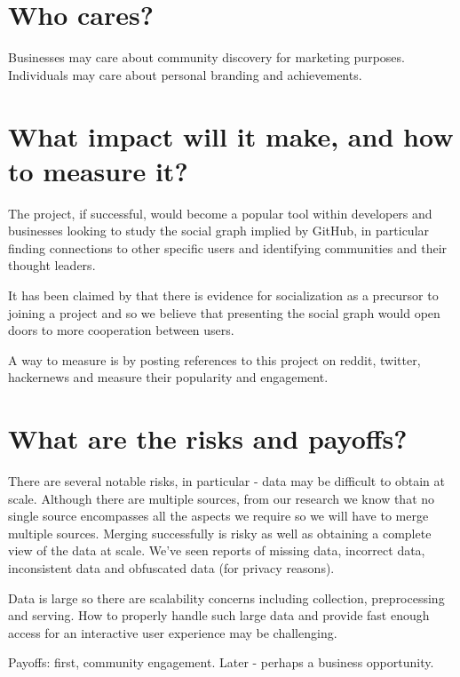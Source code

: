 \documentclass[sigconf,11pt]{acmart}
\begin{document}
\section*{Who cares?}
Businesses may care about community discovery for marketing purposes.
Individuals may care about personal branding and achievements.

\section*{What impact will it make, and how to measure it?}
The project, if successful, would become a popular tool within developers and businesses
looking to study the social graph implied by GitHub, in particular finding connections to other specific users
and identifying communities and their thought leaders.

It has been claimed by \citeauthor{developer-onboarding-github}\cite{developer-onboarding-github}
that there is evidence for socialization as a precursor to joining a project
and so we believe that presenting the social graph would open doors to more cooperation between users.

A way to measure is by posting references to this project on reddit, twitter, hackernews and measure their
popularity and engagement.

\section*{What are the risks and payoffs?}
There are several notable risks, in particular - data may be difficult to obtain at scale.
Although there are multiple sources, from our research we know that no single source encompasses all the aspects
we require so we will have to merge multiple sources.
Merging successfully is risky as well as obtaining a complete view of the data at scale.
We've seen reports of missing data, incorrect data, inconsistent data and obfuscated data (for privacy reasons)\cite{promises-and-perils-mining-github}.

Data is large so there are scalability concerns including collection, preprocessing and serving.
How to properly handle such large data and provide fast enough access for an interactive user experience may be challenging.

Payoffs: first, community engagement. Later - perhaps a business opportunity.
\end{document}
